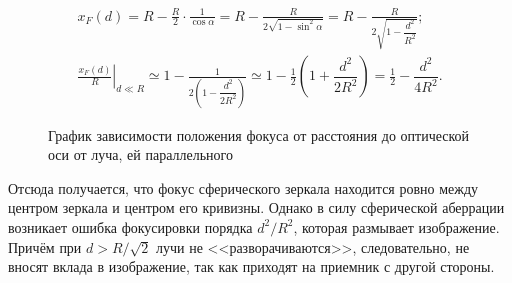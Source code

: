 \begin{gather*}
    x_F(d) = R - \frac{R}{2} \cdot \frac{1}{\cos\alpha} = R - \frac{R}{2\sqrt{1 - \sin^2 \alpha}}  = R  - \frac{R}{2\sqrt{1 - \dfrac{d^2}{R^2}}};\\
    \left. \frac{x_F(d)}{R} \right|_{d \ll R} \simeq  1  - \frac{1}{2\left(1 - \dfrac{d^2}{2R^2} \right)} \simeq  1 - \frac{1}{2}\left(1 + \dfrac{d^2}{2R^2} \right)  = \frac{1}{2} -  \dfrac{d^2}{4R^2}.
\end{gather*}
\begin{wrapfigure}[12]{r}{0.55\tw}
    \centering
    \vspace{-.5pc}
    \caption{График зависимости положения фокуса от расстояния до оптической оси от луча, ей параллельного}
\end{wrapfigure}
Отсюда получается, что фокус сферического зеркала находится ровно между центром зеркала и центром его кривизны. Однако в силу сферической аберрации возникает ошибка фокусировки порядка $d^2/R^2$, которая размывает изображение. Причём при $d > R/\sqrt{2}$ лучи не <<разворачиваются>>, следовательно, не вносят вклада в изображение, так как приходят на приемник с другой стороны.

